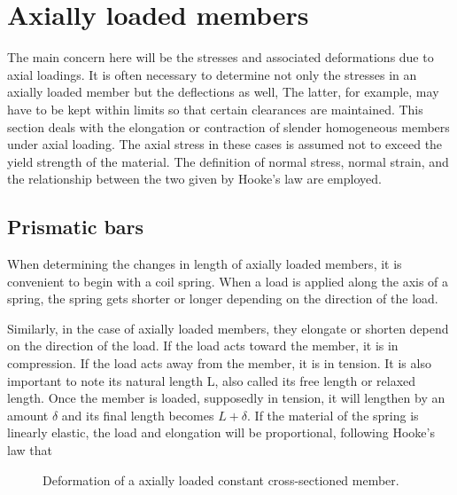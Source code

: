 \documentclass[
10pt,
a4paper,
openany,
svgnames,
]{book}
\begin{document}
\section{Axially loaded members}

The main concern here will be the stresses and associated deformations due to axial loadings. It is often necessary to determine not only the stresses in an axially loaded member but the deflections as well, The latter, for example, may have to be kept within limits so that certain clearances are maintained.
This section deals with the elongation or contraction of slender homogeneous members under axial loading. The axial stress in these cases is assumed not to exceed the yield strength of the material. The definition of normal stress, normal strain, and the relationship between the two given by Hooke’s law are employed.

\subsection{Prismatic bars}

When determining the changes in length of axially loaded members, it is convenient to begin with a coil spring. When a load is applied along the axis of a spring, the spring gets shorter or longer depending on the direction of the load.

Similarly, in the case of axially loaded members, they elongate or shorten depend on the direction of the load. If the load acts toward the member, it is in compression. If the load acts away from the member, it is in tension. It is also important to note its natural length L, also called its free length or relaxed length. Once the member is loaded, supposedly in tension, it will lengthen by an amount $\delta$ and its final length becomes $L + \delta$. If the material of the spring is linearly elastic, the load and elongation will be proportional, following Hooke’s law that

\begin{figure}[h]
  \centering
  \caption{Deformation of a axially loaded constant cross-sectioned member.}
\end{figure}
\end{document}
